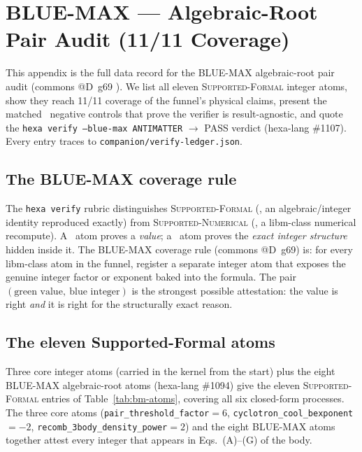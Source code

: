 \section{BLUE-MAX --- Algebraic-Root Pair Audit (11/11 Coverage)}
\label{app:bluemax}

This appendix is the full data record for the BLUE-MAX algebraic-root pair
audit (commons @D~g69 \citep{anthropic2026hexag69}). We list all eleven
\textsc{Supported-Formal} integer atoms, show they reach 11/11 coverage of the
funnel's physical claims, present the matched \tierRed\ negative controls that
prove the verifier is result-agnostic, and quote the
\texttt{hexa verify --blue-max ANTIMATTER} $\to$ PASS verdict (hexa-lang
\#1107). Every entry traces to \texttt{companion/verify-ledger.json}.

\subsection{The BLUE-MAX coverage rule}
\label{app:bm-rule}

The \texttt{hexa verify} rubric distinguishes \textsc{Supported-Formal}
(\tierBlue, an algebraic/integer identity reproduced exactly) from
\textsc{Supported-Numerical} (\tierGreen, a libm-class numerical recompute).
A \tierGreen\ atom proves a \emph{value}; a \tierBlue\ atom proves the
\emph{exact integer structure} hidden inside it. The BLUE-MAX coverage rule
(commons @D~g69) is: for every libm-class atom in the funnel, register a
separate integer atom that exposes the genuine integer factor or exponent
baked into the formula. The pair $(\text{green value},\ \text{blue integer})$
is the strongest possible attestation: the value is right \emph{and} it is
right for the structurally exact reason.

\subsection{The eleven Supported-Formal atoms}
\label{app:bm-atoms}

Three core integer atoms (carried in the kernel from the start) plus the eight
BLUE-MAX algebraic-root atoms (hexa-lang \#1094) give the eleven
\textsc{Supported-Formal} entries of Table~\ref{tab:bm-atoms}, covering all
six closed-form processes. The three core atoms
(\verb|pair_threshold_factor|$=6$, \verb|cyclotron_cool_bexponent|$=-2$,
\verb|recomb_3body_density_power|$=2$) and the eight BLUE-MAX atoms together
attest every integer that appears in Eqs.~(A)--(G) of the body.

